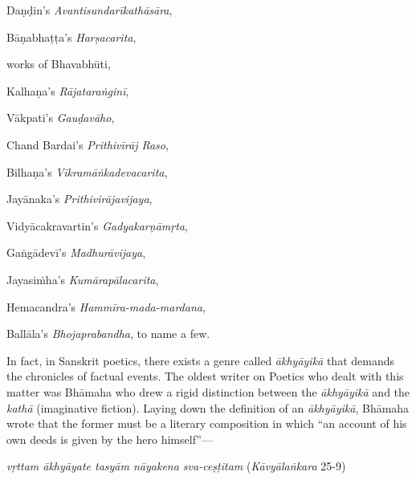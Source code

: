 Daṇḍin’s {\sl Avantisundarīkathāsāra}, 

Bāṇabhaṭṭa’s {\sl Harṣacarita},

works of Bhavabhūti,

Kalhaṇa’s {\sl Rājataraṅginī}, 

Vākpati’s {\sl Gauḍavāho}, 

Chand Bardai’s {\sl Prithivīrāj Raso}, 

Bilhaṇa’s {\sl Vikramāṅkadevacarita}, 

Jayānaka’s {\sl Prithivirājavijaya}, 

Vidyācakravartin’s {\sl Gadyakarṇāmṛta}, 

Gaṅgā\-devī’s {\sl Madhurāvijaya}, 

Jayasiṁha’s {\sl Kumārapālacarita}, 

Hemacandra’s {\sl Hammīra-mada-mardana}, 

Ballāla’s {\sl Bhojaprabandha}, to name a few. 

In fact, in Sanskrit poetics, there exists a genre called {\sl ākhyāyikā} that demands the chronicles of factual events. The oldest writer on Poetics who dealt with this matter was Bhāmaha who drew a rigid distinction between the {\sl ākhyāyikā} and the {\sl kathā} (imaginative fiction). Laying down the definition of an {\sl ākhyāyikā}, Bhāmaha wrote that the former must be a literary composition in which “an account of his own deeds is given by the hero himself”— 

{\sl vṛttam ākhyāyate tasyām nāyakena sva-ceṣṭitam} 	          \hfill{({\sl Kāvyālaṅkara} 25-9)}

